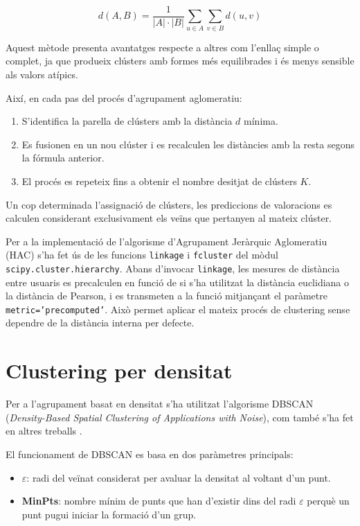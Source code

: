 \documentclass[a4paper,12pt]{report}
\begin{document}
\[
d(A, B) = \frac{1}{|A| \cdot |B|} \sum_{u \in A} \sum_{v \in B} d(u, v)
\]

Aquest mètode presenta avantatges respecte a altres com l’enllaç simple o complet, ja que produeix clústers amb formes més equilibrades i és menys sensible als valors atípics.

Així, en cada pas del procés d’agrupament aglomeratiu:
\begin{enumerate}
    \item S’identifica la parella de clústers amb la distància \(d\) mínima.
    \item Es fusionen en un nou clúster i es recalculen les distàncies amb la resta segons la fórmula anterior.
    \item El procés es repeteix fins a obtenir el nombre desitjat de clústers \(K\).
\end{enumerate}

Un cop determinada l’assignació de clústers, les prediccions de valoracions es calculen considerant exclusivament els veïns que pertanyen al mateix clúster.

Per a la implementació de l’algorisme d’Agrupament Jeràrquic Aglomeratiu (HAC) s'ha fet ús de les funcions \texttt{linkage} i \texttt{fcluster} del mòdul \texttt{scipy.cluster.hierarchy}. Abans d’invocar \texttt{linkage}, les mesures de distància entre usuaris es precalculen en funció de si s’ha utilitzat la distància euclidiana o la distància de Pearson, i es transmeten a la funció mitjançant el paràmetre \texttt{metric='precomputed'}. Això permet aplicar el mateix procés de clustering sense dependre de la distància interna per defecte.

\section{Clustering per densitat}

Per a l’agrupament basat en densitat s’ha utilitzat l’algorisme DBSCAN (\emph{Density-Based Spatial Clustering of Applications with Noise}), com també s’ha fet en altres treballs \cite{satsiou2017hybrid}.

El funcionament de DBSCAN es basa en dos paràmetres principals:
\begin{itemize}
    \item \textbf{\( \varepsilon \)}: radi del veïnat considerat per avaluar la densitat al voltant d’un punt.
    \item \textbf{MinPts}: nombre mínim de punts que han d’existir dins del radi \( \varepsilon \) perquè un punt pugui iniciar la formació d’un grup.
\end{itemize}
\end{document}
